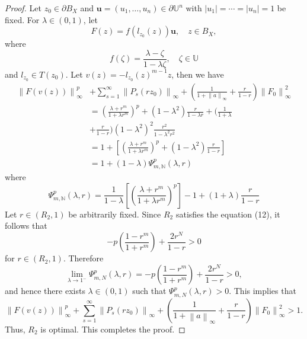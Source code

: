 \documentclass[10pt,a4paper]{amsart}
\begin{document}
\begin{proof}
	Let $z_0\in \partial B_X$ and $\mathbf{u}=(u_1,\dots,u_n)\in \partial \mathbb{U}^n$ with $|u_1|=\cdots=|u_n|=1$ be fixed. For $\lambda\in(0,1)$, let
	\begin{equation*}
		F(z)=f(l_{z_0}(z))\mathbf{u},\quad z\in B_X,
	\end{equation*}
	where
	\begin{equation*}
		f(\zeta)=\frac{\lambda-\zeta}{1-\lambda\zeta},\quad \zeta\in \mathbb{U}
	\end{equation*}
	and $l_{z_0}\in T(z_0)$.
	Let $v(z)=-l_{z_0}(z)^{m-1}z$, then we have
	\begin{align*}
		\left \| F(v(z)) \right \|_{\infty}^p &+\sum_{s=1}^{\infty}\left \| P_s(rz_0) \right \|_{\infty}+(\frac{1}{1+\left \| a \right \|_{\infty}} +\frac{r}{1-r}  )\left \| F_0 \right \|^2_{\infty} \\
		&=(\frac{\lambda+r^m }{1+\lambda r^m})^p+(1-\lambda^2)\frac{r}{1-\lambda r}+(\frac{1}{1+\lambda }\\ &+\frac{r}{1-r})(1-\lambda^2)^2\frac{r^2}{1-\lambda^2r^2}\\
		&=1+[(\frac{\lambda+r^m }{1+\lambda r^m})^p+(1-\lambda^2)\frac{r}{1-r}]\\
		&=1+(1-\lambda)\Psi  _{m,\mathbb{N}}^p(\lambda,r)
	\end{align*}
	where
	\begin{equation*}
	\Psi  _{m,\mathbb{N}}^p(\lambda,r)=\frac{1}{1-\lambda}[(\frac{\lambda+r^m }{1+\lambda r^m})^p]-1+(1+\lambda)\frac{r}{1-r}
	\end{equation*}
	Let $r \in (R_2, 1)$ be arbitrarily fixed. Since $R_2$ satisfies the equation (12), it follows that
	\begin{equation*}
	-p\left(\frac{1-r^m}{1+r^m}\right) + \frac{2r^N}{1-r} > 0
	\end{equation*}
	for $r \in (R_2, 1)$. Therefore
	\begin{equation*}
	\lim_{\lambda\to 1^-} \Psi_{m,N}^p(\lambda,r)
	= -p\left(\frac{1-r^m}{1+r^m}\right) + \frac{2r^N}{1-r}
	> 0,
    \end{equation*}
	and hence there exists $\lambda \in (0,1)$ such that $\Psi_{m,N}^p(\lambda,r) > 0$. This implies that
	\begin{equation*}
	\left \| F(v(z)) \right \|_{\infty}^p+\sum_{s=1}^{\infty}\left \| P_s(rz_0) \right \|_{\infty}+(\frac{1}{1+\left \| a \right \|_{\infty}} +\frac{r}{1-r}  )\left \| F_0 \right \|^2_{\infty} > 1.
    \end{equation*}
	Thus, $R_2$ is optimal. This completes the proof.
\end{proof}
\end{document}
